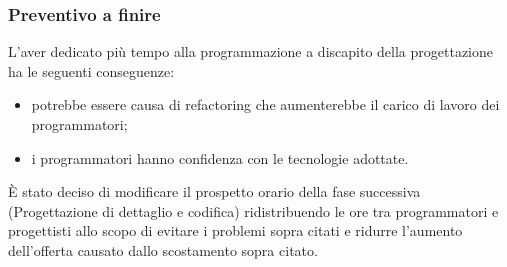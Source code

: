 \subsubsection{Preventivo a finire}
L'aver dedicato più tempo alla programmazione a discapito della progettazione ha le seguenti conseguenze:
\begin{itemize}
    \item potrebbe essere causa di refactoring che aumenterebbe il carico di lavoro dei programmatori;
    \item i programmatori hanno confidenza con le tecnologie adottate.
\end{itemize}
È stato deciso di modificare il prospetto orario della fase successiva (Progettazione di dettaglio e codifica) ridistribuendo le ore tra programmatori e progettisti allo scopo di evitare i problemi sopra citati e ridurre l'aumento dell'offerta causato dallo scostamento sopra citato.

\def\salarycontent{
    {Amministratore,22,20,440},
    {Analista,0,25,0},
    {Progettista,$80+\noexpand\textbf{10}$,22,1980},
    {Programmatore,$137-\noexpand\textbf{17}$,15,1800},
    {Responsabile,15,30,450},
    {Verificatore,82,15,1230},
    {Totale,329,127,$5935-\noexpand\textbf{35}$},
}
